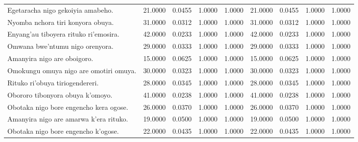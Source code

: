 \begin{table}
\begin{tabular}{lrrrrrrrr}
        Egetaracha nigo gekoiyia amabeho.                    & 21.0000                                 & 0.0455                                  & 1.0000 & 1.0000 & 21.0000   & 0.0455   & 1.0000 & 1.0000 \\
        Nyomba nchora tiri konyora obuya.                    & 31.0000                                 & 0.0312                                  & 1.0000 & 1.0000 & 31.0000   & 0.0312   & 1.0000 & 1.0000 \\
        Enyang’au tiboyera rituko ri'emosira.                & 42.0000                                 & 0.0233                                  & 1.0000 & 1.0000 & 42.0000   & 0.0233   & 1.0000 & 1.0000 \\
        Omwana bwe'ntumu nigo orenyora.                      & 29.0000                                 & 0.0333                                  & 1.0000 & 1.0000 & 29.0000   & 0.0333   & 1.0000 & 1.0000 \\
        Amanyira nigo are oboigoro.                          & 15.0000                                 & 0.0625                                  & 1.0000 & 1.0000 & 15.0000   & 0.0625   & 1.0000 & 1.0000 \\
        Omokungu omuya nigo are omotiri omuya.               & 30.0000                                 & 0.0323                                  & 1.0000 & 1.0000 & 30.0000   & 0.0323   & 1.0000 & 1.0000 \\
        Rituko ri'obuya tiriogendereri.                      & 28.0000                                 & 0.0345                                  & 1.0000 & 1.0000 & 28.0000   & 0.0345   & 1.0000 & 1.0000 \\
        Obororo tibonyora obuya k'omoyo.                     & 41.0000                                 & 0.0238                                  & 1.0000 & 1.0000 & 41.0000   & 0.0238   & 1.0000 & 1.0000 \\
        Obotaka nigo bore engencho kera ogose.               & 26.0000                                 & 0.0370                                  & 1.0000 & 1.0000 & 26.0000   & 0.0370   & 1.0000 & 1.0000 \\
        Amanyira nigo are amarwa k'era rituko.               & 19.0000                                 & 0.0500                                  & 1.0000 & 1.0000 & 19.0000   & 0.0500   & 1.0000 & 1.0000 \\
        Obotaka nigo bore engencho k’ogose.                  & 22.0000                                 & 0.0435                                  & 1.0000 & 1.0000 & 22.0000   & 0.0435   & 1.0000 & 1.0000 \\

\end{tabular}
\end{table}
